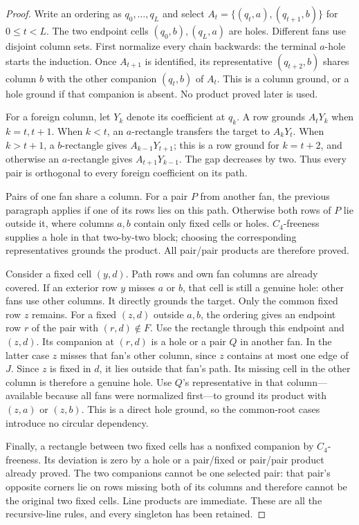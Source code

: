 \documentclass[11pt,a4paper]{article}
\theoremstyle{definition}
\begin{document}
\begin{proof}
Write an ordering as $q_0,\ldots,q_L$ and select
$A_t=\{(q_t,a),(q_{t+1},b)\}$ for $0\le t<L$.
The two endpoint cells $(q_0,b),(q_L,a)$ are holes. Different fans use
disjoint column sets. First normalize every chain backwards: the terminal
$a$-hole starts the induction. Once $A_{t+1}$ is identified, its representative
$(q_{t+2},b)$ shares column $b$ with the other companion $(q_t,b)$
of $A_t$. This is a column ground, or a hole ground if that companion
is absent. No product proved later is used.

For a foreign column, let $Y_k$ denote its coefficient at $q_k$.
A row grounds $A_tY_k$ when $k=t,t+1$. When $k<t$, an $a$-rectangle
transfers the target to $A_kY_t$. When $k>t+1$, a $b$-rectangle gives
$A_{k-1}Y_{t+1}$; this is a row ground for $k=t+2$, and otherwise an
$a$-rectangle gives $A_{t+1}Y_{k-1}$. The gap decreases by two.
Thus every pair is orthogonal to every foreign coefficient on its path.

Pairs of one fan share a column. For a pair $P$ from another fan, the
previous paragraph applies if one of its rows lies on this path. Otherwise
both rows of $P$ lie outside it, where columns $a,b$ contain only fixed
cells or holes. $C_4$-freeness supplies a hole in that two-by-two block;
choosing the corresponding representatives grounds the product. All
pair/pair products are therefore proved.

Consider a fixed cell $(y,d)$. Path rows and own fan columns are already
covered. If an exterior row $y$ misses $a$ or $b$, that cell is still a
genuine hole: other fans use other columns. It directly grounds the target.
Only the common fixed row $z$ remains. For a fixed $(z,d)$ outside $a,b$,
the ordering gives an endpoint row $r$ of the pair with $(r,d)\notin F$.
Use the rectangle through this endpoint and $(z,d)$. Its companion at
$(r,d)$ is a hole or a pair $Q$ in another fan. In the latter case $z$
misses that fan's other column, since $z$ contains at most one edge of $J$.
Since $z$ is fixed in $d$, it lies outside that fan's path. Its missing
cell in the other column is therefore a genuine hole. Use $Q$'s
representative in that column---available because all fans were normalized
first---to ground its product with $(z,a)$ or $(z,b)$. This is a direct
hole ground, so the common-root cases introduce no circular dependency.

Finally, a rectangle between two fixed cells has a nonfixed companion
by $C_4$-freeness. Its deviation is zero by a hole or a pair/fixed or pair/pair product
already proved. The two companions cannot be one selected pair: that
pair's opposite corners lie on rows missing both of its columns and
therefore cannot be the original two fixed cells. Line products are
immediate. These are all the recursive-line rules, and every singleton
has been retained.
\end{proof}
\end{document}
